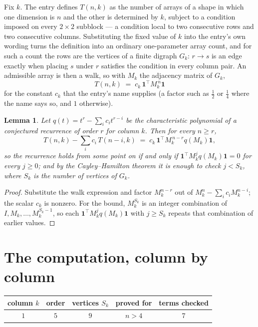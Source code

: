 \documentclass[11pt,a4paper]{article}
\theoremstyle{plain}
\newtheorem{lemma}[theorem]{Lemma}
\theoremstyle{definition}
\begin{document}
Fix $k$. The entry defines $T(n,k)$ as the number of arrays of a shape in which one dimension
is $n$ and the other is determined by $k$, subject to a condition imposed on every
$2\times2$ subblock --- a condition local to two consecutive rows and two consecutive columns.
Substituting the fixed value of $k$ into the entry's own wording turns the definition into an
ordinary one-parameter array count, and for such a count the rows are the vertices of a finite
digraph $G_k$: $r\to s$ is an edge exactly when placing $s$ under $r$ satisfies the condition
in every column pair. An admissible array is then a walk, so with $M_k$ the adjacency matrix
of $G_k$,
\[
T(n,k)\;=\;c_k\,\mathbf{1}^{\!\top}M_k^{\,n}\mathbf{1}
\]
for the constant $c_k$ that the entry's name supplies (a factor such as $\tfrac12$ or
$\tfrac14$ where the name says so, and $1$ otherwise).

\begin{lemma}\label{lem:crit}
Let $q(t)=t^{r}-\sum_i c_it^{r-i}$ be the characteristic polynomial of a conjectured
recurrence of order $r$ for column $k$. Then for every $n\ge r$,
\[
T(n,k)-\sum_i c_i\,T(n-i,k)\;=\;c_k\,\mathbf{1}^{\!\top}M_k^{\,n-r}q(M_k)\mathbf{1},
\]
so the recurrence holds from some point on if and only if
$\mathbf{1}^{\!\top}M_k^{j}q(M_k)\mathbf{1}=0$ for every $j\ge0$; and by the
Cayley--Hamilton theorem it is enough to check $j<S_k$, where $S_k$ is the number of vertices
of $G_k$.
\end{lemma}

\begin{proof}
Substitute the walk expression and factor $M_k^{n-r}$ out of $M_k^{n}-\sum_ic_iM_k^{n-i}$;
the scalar $c_k$ is nonzero. For the bound, $M_k^{S_k}$ is an integer combination of
$I,M_k,\dots,M_k^{S_k-1}$, so each $\mathbf{1}^{\!\top}M_k^{j}q(M_k)\mathbf{1}$ with
$j\ge S_k$ repeats that combination of earlier values.
\end{proof}

\section{The computation, column by column}

\begin{center}
\begin{tabular}{ccccc}
column $k$ & order & vertices $S_k$ & proved for & terms checked \\ \hline
$1$ & $5$ & $9$ & $n>4$ & $7$ \\
\end{tabular}
\end{center}
\end{document}
